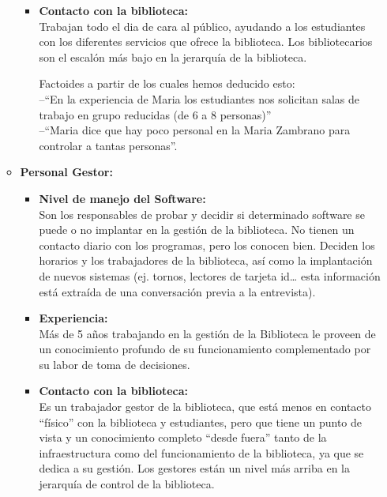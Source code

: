 \documentclass[12pt]{article}
\begin{document}
\begin{itemize}
\begin{itemize}
\begin{itemize}
		\item \textbf{Contacto con la biblioteca: \\}
			Trabajan todo el dia de cara al público, ayudando a los estudiantes con los diferentes servicios que ofrece la biblioteca. Los bibliotecarios son el escalón más bajo en la jerarquía de la biblioteca.
			
			Factoides a partir de los cuales hemos deducido esto: \\ --``En la experiencia de Maria los estudiantes nos solicitan salas de trabajo en grupo reducidas (de 6 a 8 personas)'' \\ --``Maria dice que hay poco personal en la Maria Zambrano para controlar a tantas personas''.
			
	\end{itemize}
	\item \textbf{Personal Gestor: }
	\begin{itemize}
		\item \textbf{Nivel de manejo del Software: \\}
			Son los responsables de probar y decidir si determinado software se puede o no implantar en la gestión de la biblioteca. No tienen un contacto diario con los programas, pero los conocen bien. Deciden los horarios y los trabajadores de la biblioteca, así como la implantación de nuevos sistemas (ej. tornos, lectores de tarjeta id… esta información está extraída de una conversación previa a la entrevista).
			
		\item \textbf{Experiencia: \\}
			Más de 5 años trabajando en la gestión de la Biblioteca le proveen de un conocimiento profundo de su funcionamiento complementado por su labor de toma de decisiones.
			
		\item \textbf{Contacto con la biblioteca: \\}
			Es un trabajador gestor de la biblioteca, que está menos en contacto ``físico'' con la biblioteca y estudiantes, pero que tiene un punto de vista y un conocimiento completo ``desde fuera'' tanto de la infraestructura como del funcionamiento de la biblioteca, ya que se dedica a su gestión. Los gestores están un nivel más arriba en la jerarquía de control de la biblioteca.
			
	\end{itemize}
\end{itemize}


\end{itemize}
\end{document}
